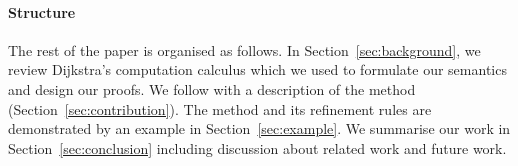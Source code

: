 






\paragraph{Structure} The rest of the paper is organised as follows.
In Section~\ref{sec:background}, we review Dijkstra's computation
calculus \cite{Dijkstra:1998p1128} which we used to formulate our
semantics and design our proofs.  We follow with a description of the
\unitb method (Section~\ref{sec:contribution}).  The method and its
refinement rules are demonstrated by an example in
Section~\ref{sec:example}.  We summarise our work in 
Section~\ref{sec:conclusion} including discussion about related work
and future work.


